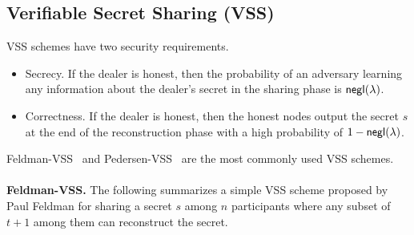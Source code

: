 

\subsection{Verifiable Secret Sharing (VSS)}
\label{appendix:vss}

VSS schemes have two security requirements.
\begin{itemize}
    \item Secrecy. If the dealer is honest, then the probability of an adversary learning
    any information about the dealer's secret in the sharing phase is $\mathsf{negl}(\lambda)$.
    \item Correctness. If the dealer is honest, then the honest nodes output the secret
    $s$ at the end of the reconstruction phase with a high probability of $1 - \mathsf{negl}(\lambda)$.
\end{itemize}
Feldman-VSS~\cite{feldman1987practical} and Pedersen-VSS~\cite{pedersen1991non} are the most commonly used VSS schemes.\\\\
\noindent\textbf{Feldman-VSS.}
\label{appendix:feldmanVSS}
The following summarizes a simple VSS scheme proposed by Paul Feldman for sharing a secret $s$ among $n$ participants where any subset of $t + 1$ among them can reconstruct the secret.

